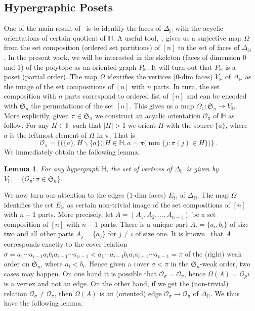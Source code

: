 \documentclass[reqno]{amsart}
\newtheorem{lemma}[theorem]{Lemma}
\theoremstyle{definition}
\newcommand{\ssm}{\smallsetminus} %
\newcommand{\fS}{\mathfrak{S}} %
\newcommand{\Or}{\mathcal O}  %
\newcommand{\HH}{\mathbb H}  %
\begin{document}
\subsection{Hypergraphic Posets} 
\label{subsec:P_H}
One of the main result of~\cite[Thm 3.18]{BenBerMac} is to identify the faces of $\Delta_\HH$ with the acyclic orientations of certain quotient of $\HH$.  A useful tool,~\cite[Lem 2.9]{BenBerMac}, gives us a surjective map $\Omega$ from the set composition (ordered set partitions) of $[n]$ to the set of faces of $\Delta_\HH$. 
 In the present work, we will be interested in the skeleton (faces of dimension 0 and 1)
of the polytope as an oriented graph $P_{\HH}$. It will turn out that $P_{\HH}$ is a poset (partial order).  The map $\Omega$ identifies the vertices (0-dim faces) $V_{\HH}$  of $\Delta_{\HH}$ as the image of the set compositions of $[n]$ with $n$ parts. In turn, the set composition with $n$ parts correspond to ordered list of $[n]$ and can be encoded with $\fS_n$ the permutations of the set $[n]$. This gives us a map $\Omega_1 \colon \fS_n \to V_{\HH}$.
More explicitly, given $\pi\in\fS_n$ we construct an acyclic orientation $\Or_\pi$ of $\HH$ as follow. For any $H\in \HH$ such that $|H|>1$ we orient $H$  with the source $\{a\}$, where $a$ is the leftmost element of $H$ in $\pi$. That is
	$$\Or_\pi = \Big\{\big(\{a\},H\ssm\{a\}\big)\big| H\in \HH, a=\pi\big(\min\{j: \pi(j)\in H\}\big)\Big\}\,.
	$$
We immediately obtain the following lemma.

\begin{lemma}\label{lem:Hvertices}
For any hypergraph $\HH$, the set of vertices of $\Delta_{\HH}$ is given by $V_{\HH}=\{\Or_\pi: \pi\in \fS_n\}$.
\end{lemma}

We now turn our attention to the edges (1-dim faces) $E_{\HH}$ of $\Delta_{\HH}$. The map $\Omega$ identifies the set $E_{\HH}$ as certain non-trivial image of the set compositions of $[n]$ with $n-1$ parts.
More precisely, let $A=(A_1,A_2,\ldots,A_{n-1})$ be a set composition of $[n]$ with $n-1$ parts. There is a unique part $A_i=\{a_i,b_i\}$ of size two and all other parts $A_j=\{a_j\}$ for $j\neq i$ of size one. It is known~\cite{???} that $A$ 
corresponds  exactly to the cover relation $\sigma=a_1\cdots a_{i-1}a_ib_ia_{i+1}\cdots a_{n-1} < a_1\cdots a_{i-1}b_ia_ia_{i+1}\cdots a_{n-1}=\pi$ of the (right) weak order on $\fS_n$, where $a_i<b_i$. 
Hence given a cover $\sigma < \pi$ in the $\fS_n$-weak  order, two cases may happen. On one hand it is possible that $\Or_\sigma=\Or_\pi$, hence $\Omega(A)=\Or_pi$ is a vertex and not an edge. On the other hand, if we get the (non-trivial)
relation $\Or_\sigma\ne \Or_\pi$, then $\Omega(A)$ is an (oriented) edge $\Or_\sigma\to\Or_\pi$ of $\Delta_{\HH}$. We thus have the following lemma.
\end{document}
